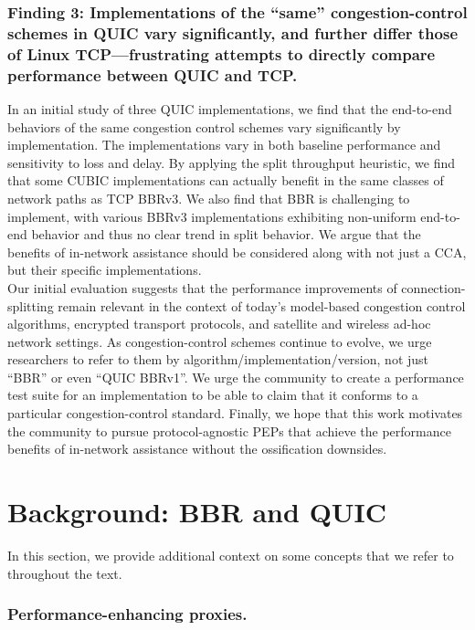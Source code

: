 \subsubsection{Finding 3: Implementations of the ``same'' congestion-control
 schemes in QUIC vary significantly, and further differ those of Linux
 TCP---frustrating attempts to directly compare performance between QUIC and
 TCP.}

In an initial study of three QUIC implementations, we find that the end-to-end
behaviors of the same congestion control schemes vary significantly by implementation.
The implementations vary in both baseline performance and sensitivity to loss
and delay. By applying the split throughput heuristic, we find that some
CUBIC implementations can actually benefit in the same classes of network paths
as TCP BBRv3. We also find that BBR is challenging to implement, with various
BBRv3 implementations exhibiting non-uniform end-to-end behavior and thus no
clear trend in split behavior. We argue that the benefits of in-network
assistance should be considered along with not just a CCA, but their specific
implementations. \\

\noindent Our initial evaluation suggests that the performance improvements of
connection-splitting remain relevant in the context of today's model-based
congestion control algorithms, encrypted transport protocols, and satellite and
wireless ad-hoc network settings. As congestion-control schemes continue to
evolve, we urge researchers to refer to them by
algorithm/implementation/version, not just ``BBR'' or even ``QUIC BBRv1''. We
urge the community to create a performance test suite for an implementation to
be able to claim that it conforms to a particular congestion-control standard.
Finally, we hope that this work motivates the community to pursue
protocol-agnostic PEPs that achieve the performance benefits of in-network
assistance without the ossification downsides.

\section{Background: BBR and QUIC}
\label{sec:splitting:background}

In this section, we provide additional context on some concepts that we refer to
throughout the text.

\subsubsection{Performance-enhancing proxies.}

